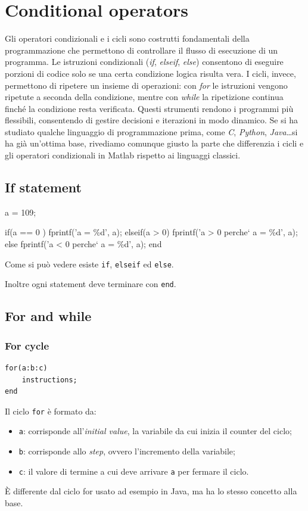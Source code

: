 \section{Conditional operators}
Gli operatori condizionali e i cicli sono costrutti fondamentali della programmazione che permettono di controllare il flusso di esecuzione di un programma.
Le istruzioni condizionali (\emph{if}, \emph{elseif}, \emph{else}) consentono di eseguire porzioni di codice solo se una certa condizione logica risulta vera.
I cicli, invece, permettono di ripetere un insieme di operazioni:
con \emph{for} le istruzioni vengono ripetute a seconda della condizione, mentre con \emph{while} la ripetizione continua finché la condizione resta verificata.
Questi strumenti rendono i programmi più flessibili, consentendo di gestire decisioni e iterazioni in modo dinamico.
Se si ha studiato qualche linguaggio di programmazione prima, come \emph{C}, \emph{Python},
\emph{Java}\dots si ha già un'ottima base, rivediamo comunque giusto la parte che differenzia i cicli e
gli operatori condizionali in Matlab rispetto ai linguaggi classici.
\subsection{If statement}
\begin{matlab}
a = 109;

if(a == 0 )
    fprintf('a = \%d\n', a);
elseif(a > 0)
    fprintf('a > 0 perche` a = \%d\n', a);
else
    fprintf('a < 0 perche` a = \%d\n', a);
end
\end{matlab}
Come si può vedere esiste \verb|if|, \verb|elseif| ed \verb|else|.

Inoltre ogni statement deve terminare con \verb|end|.

\subsection{For and while}
\subsubsection{For cycle}
\begin{verbatim}
for(a:b:c)
    instructions;
end
\end{verbatim}

Il ciclo \verb|for| è formato da:
\begin{itemize}
    \item \verb|a|: corrisponde all'\emph{initial value}, la variabile da cui inizia il counter del ciclo;
    \item \verb|b|: corrisponde allo \emph{step}, ovvero l'incremento della variabile;
    \item \verb|c|: il valore di termine a cui deve arrivare \verb|a| per fermare il ciclo.
\end{itemize}
È differente dal ciclo for usato ad esempio in Java, ma ha lo stesso concetto alla base.

